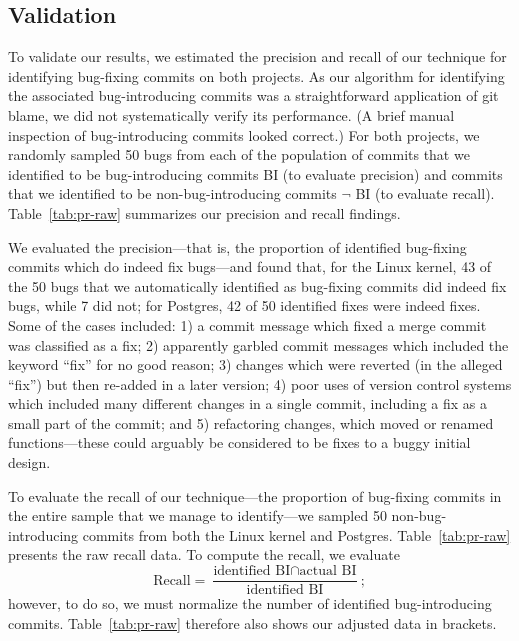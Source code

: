 \subsection{Validation} 
To validate our results, we estimated the precision and recall of our
technique for identifying bug-fixing commits on both projects.  As our
algorithm for identifying the associated bug-introducing commits was a
straightforward application of git blame, we did not systematically
verify its performance. (A brief manual inspection of bug-introducing
commits looked correct.) For both projects, we randomly sampled 50 bugs
from each of the population of commits that we identified to be
bug-introducing commits BI (to evaluate precision) and commits that we
identified to be non-bug-introducing commits $\neg$ BI (to evaluate recall).
Table~\ref{tab:pr-raw} summarizes our precision and
recall findings.

We evaluated the precision---that is, the proportion of identified
bug-fixing commits which do indeed fix bugs---and found that, for
the Linux kernel, 43 of the 50 bugs that we automatically identified as
bug-fixing commits did indeed fix bugs, while 7 did not; for Postgres,
42 of 50 identified fixes were indeed fixes.  Some of the
cases included: 1) a commit message which fixed a merge commit was
classified as a fix; 2) apparently garbled commit messages which
included the keyword ``fix'' for no good reason; 3) changes which were
reverted (in the alleged ``fix'') but then re-added in a later
version; 4) poor uses of version control systems which included many
different changes in a single commit, including a fix as a small part 
of the commit; and 5) refactoring changes, which moved or renamed
functions---these could arguably be considered to be fixes to a buggy
initial design.

To evaluate the recall of our technique---the proportion of bug-fixing
commits in the entire sample that we manage to identify---we sampled
50 non-bug-introducing commits from both the Linux kernel and
Postgres. Table~\ref{tab:pr-raw} presents the raw recall data. To compute
the recall, we evaluate
\[ \mbox{Recall} = \frac{\mbox{identified BI} \cap \mbox{actual BI}}{\mbox{identified BI}}; \]
however, to do so, we must normalize the number of identified bug-introducing
commits. Table~\ref{tab:pr-raw} therefore also shows our adjusted data in 
brackets.


